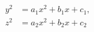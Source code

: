 \begin{proposition}
\[
    \begin{aligned}y^2&=a_1x^2+b_1x+c_1,\\z^2&=a_2x^2+b_2x+c_2\end{aligned}
\]
\end{proposition}
